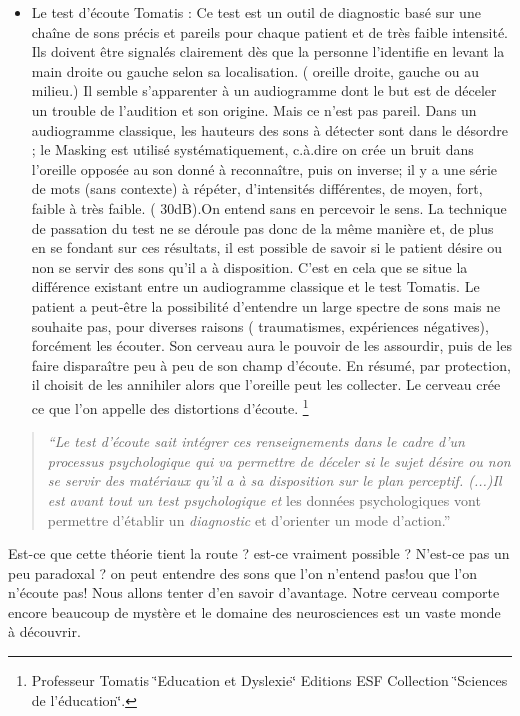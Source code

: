 \begin{itemize}
\begin{itemize}
\item Le test d'écoute Tomatis : Ce test est un outil de diagnostic  basé sur une chaîne
de sons précis et pareils pour chaque patient et de très faible intensité. Ils doivent être signalés clairement  dès que la personne l'identifie
en  levant la main droite ou gauche selon sa localisation. ( oreille droite, gauche ou au milieu.)
Il semble s'apparenter à un audiogramme dont le but est de déceler
un trouble de l'audition et son origine. Mais ce n'est pas pareil. Dans un audiogramme classique, les hauteurs des sons à détecter sont dans le désordre ; le Masking est utilisé systématiquement, c.à.dire on crée un bruit dans l'oreille opposée au son donné à reconnaître, puis on inverse; il y a une série de mots (sans contexte) à répéter, d'intensités différentes, de moyen, fort, faible à très faible. ( 30dB).On entend sans en percevoir le sens.
La technique de passation du test ne se déroule pas donc de la même manière
et, de plus en se fondant sur ces résultats, il est possible de savoir
si le patient désire ou non se servir des sons qu'il a à disposition.
C'est en cela que se situe la différence existant entre un audiogramme classique
et le test Tomatis. Le patient a peut-être la possibilité d'entendre
un large spectre de sons mais ne souhaite pas, pour diverses raisons
( traumatismes, expériences négatives), forcément les écouter. Son
cerveau aura le pouvoir de les assourdir, puis de les faire disparaître
peu à peu de son champ d'écoute. En résumé, par protection, il choisit
de les annihiler alors que l'oreille peut les collecter. Le cerveau
crée ce que l'on appelle des distortions d'écoute. \footnote{Professeur Tomatis \char`\"{}Education et Dyslexie\char`\"{} Editions
ESF Collection \char`\"{}Sciences de l'éducation\char`\"{}.}
\end{itemize}
\begin{quote}
\emph{``Le test d'écoute sait intégrer ces renseignements dans le
cadre d'un processus psychologique qui va permettre de déceler si
le sujet désire ou non se servir des matériaux qu'il a à sa disposition
sur le plan perceptif. (...)Il est avant tout un test psychologique
et} les données psychologiques vont permettre d'établir un\emph{ diagnostic}
et d'orienter un mode d'action.''
\end{quote}
Est-ce que cette théorie tient la route ? est-ce vraiment possible
? N'est-ce pas un peu paradoxal ? on peut entendre des sons que l'on
n'entend pas!ou que l'on n'écoute pas! Nous allons tenter d'en savoir
d'avantage. Notre cerveau comporte encore beaucoup de mystère et le
domaine des neurosciences est un vaste monde à découvrir. 


\end{itemize}

